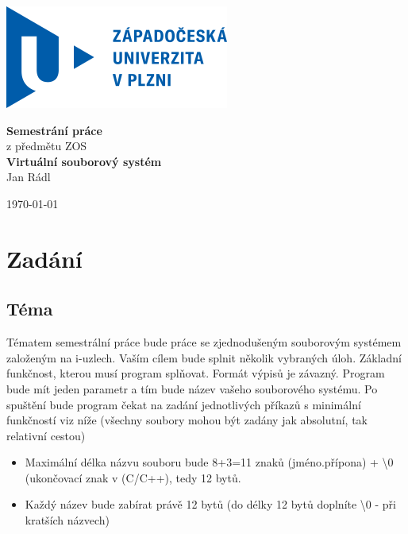 \documentclass[12pt, a4paper]{report}
\begin{document}
\begin{titlepage}
\includegraphics{logo}
\enlargethispage{25mm}
\addtolength{\topmargin}{-8mm}
\thispagestyle{empty}
\vspace*{\fill}
\begin{center}
      {\Huge \bf {Semestrání práce}}\\[0.2cm]
      { z předmětu ZOS}\\[0.1cm]
      {\large \bf Virtuální souborový systém}\\[0.5cm]
      
      {\Large Jan Rádl}\\[0.4cm]
\end{center}
\vspace*{\fill}
\begin{flushright}
\vfill
\today
\end{flushright}
\end{titlepage}

\tableofcontents




\chapter{Zadání}
\section{Téma}
Tématem semestrální práce bude práce se zjednodušeným souborovým systémem založeným na
i-uzlech. Vaším cílem bude splnit několik vybraných úloh.
Základní funkčnost, kterou musí program splňovat. Formát výpisů je závazný.
Program bude mít jeden parametr a tím bude název vašeho souborového systému. Po spuštění bude
program čekat na zadání jednotlivých příkazů s minimální funkčností viz níže (všechny soubory
mohou být zadány jak absolutní, tak relativní cestou)
\begin{itemize}
\item Maximální délka názvu souboru bude 8+3=11 znaků (jméno.přípona) + {\textbackslash}0 (ukončovací znak v (C/C++), tedy 12 bytů.
 \item Každý název bude zabírat právě 12 bytů (do délky 12 bytů doplníte \textbackslash0 - při kratších názvech)
\end{itemize}
\end{document}
